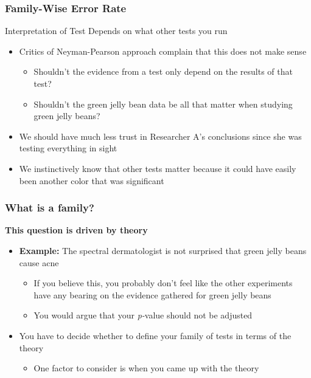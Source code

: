 \documentclass[10pt, block=fill]{beamer}
\newcommand{\p}[1]{\textit{p-}}
\begin{document}
\begin{frame}
  \frametitle{Family-Wise Error Rate}

  \begin{block}{Interpretation of Test}
    Depends on what other tests you run
  \end{block}
  
  \begin{itemize}
      \item Critics of Neyman-Pearson approach complain that this does not make sense
      \begin{itemize}
        \item Shouldn't the evidence from a test only depend on the results of that test?
        \item Shouldn't the green jelly bean data be all that matter when studying green jelly beans?
      \end{itemize}
      \item We should have much less trust in Researcher A's conclusions since she was testing everything in sight
      \item We instinctively know that other tests matter because it could have easily been another color that was significant
  \end{itemize}
  
\end{frame}


\begin{frame}
  \frametitle{What is a family?}
    
  \textbf{This question is driven by theory}
  
  \begin{itemize}
    \item \textbf{Example:} The spectral dermatologist is not surprised that green jelly beans cause acne
    \begin{itemize}
      \item If you believe this, you probably don't feel like the other experiments have any bearing on the evidence gathered for green jelly beans
      \item You would argue that your \textit{\p-}value should not be adjusted
    \end{itemize}
    \item You have to decide whether to define your family of tests in terms of the theory
    \begin{itemize}
      \item One factor to consider is when you came up with the theory
    \end{itemize}
  \end{itemize}
\end{frame}
\end{document}
